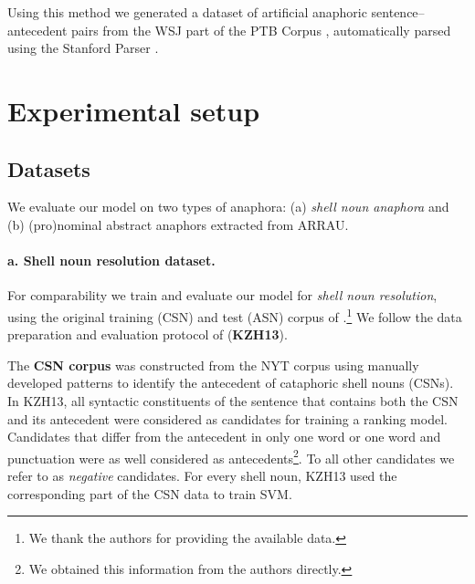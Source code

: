 \documentclass[11pt,letterpaper]{article}
\begin{document}
Using this method we generated a dataset of artificial anaphoric sentence--antecedent pairs from the WSJ  part of the PTB Corpus \citep{marcus1993building},
automatically parsed using the Stanford Parser \cite{klein2003accurate}. 










 	
	\section{Experimental setup}

\subsection{Datasets}


\noindent
We evaluate our model on two types of anaphora: (a) {\em shell noun anaphora} and (b) (pro)nominal abstract 
anaphors extracted from ARRAU.




\paragraph{a. Shell noun resolution dataset.}\hspace*{-3mm}
For com\-pa\-ra\-bi\-li\-ty we train and evaluate our model for
{\em shell noun resolution}, using the 
original training (CSN) and test (ASN) corpus of \citet{kolhatkar-zinsmeister-hirst:2013:LAW7-ID, kolhatkar-zinsmeister-hirst:2013:EMNLP}.\footnote{We thank the authors for providing the available data.} \hspace*{-0mm} We follow the data preparation and evaluation protocol of  \citet{kolhatkar-zinsmeister-hirst:2013:EMNLP}
({\bf KZH13}). 


The {\bf CSN corpus} was constructed from the NYT corpus using manually developed patterns to identify the antecedent of cataphoric shell nouns (CSNs). In KZH13, all syntactic constituents of the sentence that contains both the CSN and its antecedent were considered as candidates for training a ranking model. Candidates that differ from the antecedent in only one word or one word and punctuation were as well considered as antecedents\footnote{We obtained this information from the authors directly.}. To all other candidates we refer to as \textit{negative} candidates. For every shell noun, KZH13 used the corresponding part of the CSN data to train SVM.
\end{document}
